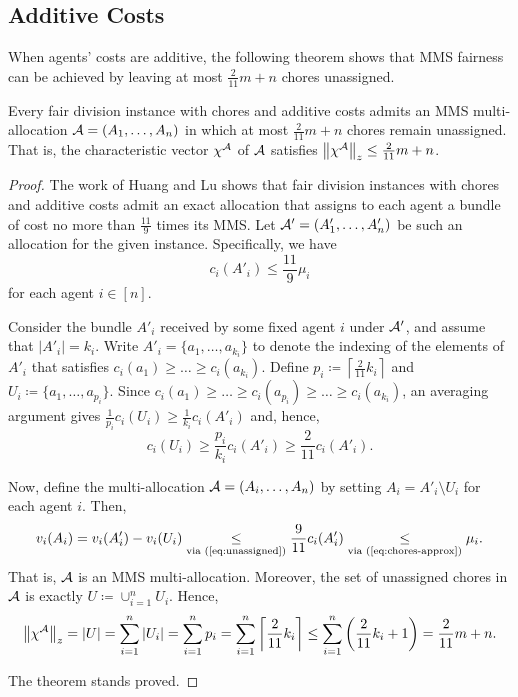 \subsection{Additive Costs}

When agents' costs are additive, the following theorem shows that MMS fairness can be achieved by leaving at most $\frac{2}{11}m + n$ chores unassigned.

\begin{theorem}
    \label{thm:chores-additive}
        Every fair division instance with chores and additive costs admits an MMS multi-allocation $\mathcal{A} = (A_1, \dots, A_n)$ in which at most $\frac{2}{11}m + n$ chores remain unassigned. That is, the characteristic vector $\chi^{\mathcal{A}}$ of $\mathcal{A}$ satisfies $\left\|\chi^{\mathcal{A}}\right\|_z \leq \frac{2}{11}m + n$.
    \end{theorem}
    
    \begin{proof}
        The work of Huang and Lu \cite{10.1145/3465456.3467555} shows that fair division instances with chores and additive costs admit an exact allocation that assigns to each agent a bundle of cost no more than $\frac{11}{9}$ times its MMS. Let $\mathcal{A}' = (A'_1, \dots, A'_n)$ be such an allocation for the given instance. Specifically, we have \begin{equation} c_i(A'_i) \leq \frac{11}{9} \mu_i \label{eq:chores-approx}
        \end{equation} for each agent $i \in [n]$.
    
        Consider the bundle $A'_i$ received by some fixed agent $i$ under $\mathcal{A}'$, and assume that $|A'_i| = k_i$. Write $A'_i = \{a_1, \dots, a_{k_i}\}$ to denote the indexing of the elements of $A'_i$ that satisfies $c_i(a_1) \geq \dots \geq c_i(a_{k_i})$. Define $p_i \coloneqq \left\lceil \frac{2}{11} k_i \right\rceil$ and $U_i \coloneqq \{a_1, \dots, a_{p_i}\}.$ Since $c_i(a_1) \geq \dots \geq c_i(a_{p_i}) \geq \dots \geq c_i(a_{k_i})$, an averaging argument gives $\frac{1}{p_i} c_i(U_i) \geq \frac{1}{k_i} c_i(A'_i)$ and, hence, 
        \begin{equation} c_i(U_i) \geq \frac{p_i}{k_i} c_i(A'_i) \geq \frac{2}{11} c_i(A'_i). \label{eq:unassigned}
        \end{equation}
    
        Now, define the multi-allocation $\mathcal{A} = (A_i, \dots, A_n)$ by setting $A_i = A'_i \setminus U_i$ for each agent $i$. Then, $$v_i(A_i) 
        = v_i(A'_i) - v_i(U_i) 
        \underset{\text{via (\ref{eq:unassigned})}}{\leq} \frac{9}{11} c_i(A'_i) 
        \underset{\text{via (\ref{eq:chores-approx})}}{\leq} \mu_i.$$ That is, $\mathcal{A}$ is an MMS multi-allocation. Moreover, the set of unassigned chores in $\mathcal{A}$ is exactly $U \coloneqq \cup_{i=1}^n U_i$. Hence, 
        \begin{align*} \left\|\chi^{\mathcal{A}}\right\|_z 
            = |U| 
            = \sum_{i=1}^n |U_i|
            = \sum_{i=1}^n p_i 
            = \sum_{i=1}^n \left\lceil \frac{2}{11} k_i \right\rceil 
            \leq \sum_{i=1}^n \left( \frac{2}{11} k_i + 1 \right) 
            = \frac{2}{11}m + n. 
        \end{align*}

        The theorem stands proved.
    \end{proof}
 